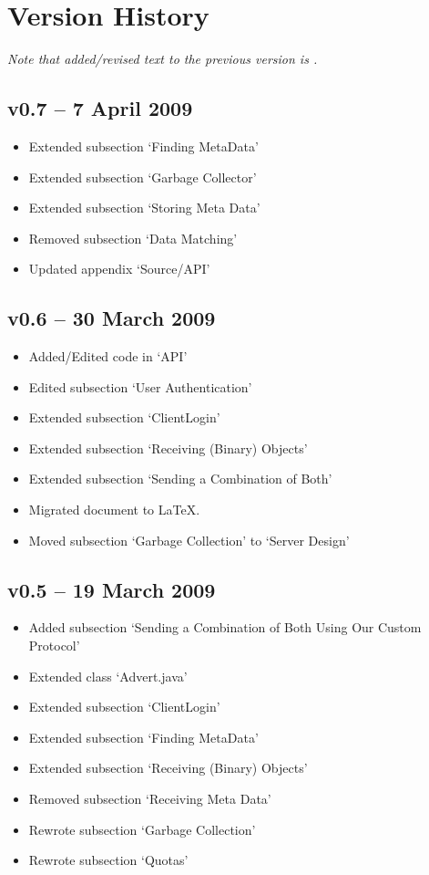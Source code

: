 \section{Version History}
\emph{Note that added/revised text to the previous version is .}

\subsection*{v0.7 -- 7 April 2009}
\begin{itemize}
  \item Extended subsection `Finding MetaData'
  \item Extended subsection `Garbage Collector'
  \item Extended subsection `Storing Meta Data'
  \item Removed subsection `Data Matching'
  \item Updated appendix `Source/API'
\end{itemize}

\subsection*{v0.6 -- 30 March 2009}
\begin{itemize}
  \item Added/Edited code in `API' 
  \item Edited subsection `User Authentication'
  \item Extended subsection `ClientLogin'
  \item Extended subsection `Receiving (Binary) Objects'
  \item Extended subsection `Sending a Combination of Both'
  \item Migrated document to \LaTeX.
  \item Moved subsection `Garbage Collection' to `Server Design'
\end{itemize}

\subsection*{v0.5 -- 19 March 2009}
\begin{itemize}
  \item Added subsection `Sending a Combination of Both Using Our Custom Protocol'
  \item Extended class `Advert.java'
  \item Extended subsection `ClientLogin'
  \item Extended subsection `Finding MetaData'
  \item Extended subsection `Receiving (Binary) Objects'
  \item Removed subsection `Receiving Meta Data'
  \item Rewrote subsection `Garbage Collection'
  \item Rewrote subsection `Quotas'
\end{itemize}

